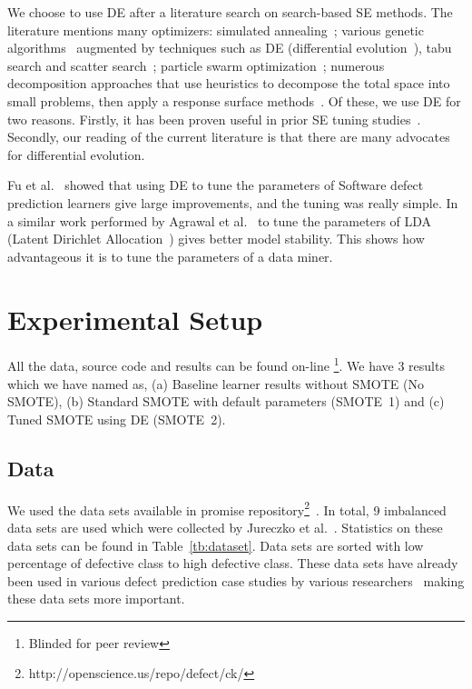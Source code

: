\documentclass[sigconf,review, anonymous]{acmart}
\theoremstyle{break}
\theoremstyle{break}
\begin{document}
We choose to use DE after a literature search on search-based SE methods.
The literature mentions many optimizers: simulated
annealing~\cite{feather2002converging, menzies2007business}; various genetic
algorithms~\cite{goldberg1979complexity} augmented by techniques such as
DE (differential evolution~\cite{storn1997differential}), tabu search and scatter
search~\cite{glover1986general, beausoleil2006moss, molina2007sspmo,nebro2008abyss}; particle swarm optimization~\cite{pan2008particle}; numerous
decomposition approaches that use heuristics to decompose the total space into
small problems, then apply a response surface methods~\cite{krall2015gale, zuluaga2013active}.
Of these, we use DE for two reasons. Firstly, it has been proven useful in prior SE tuning
studies~\cite{fu2016tuning, agrawal2016wrong}. Secondly, our reading of the current literature is
that there are many advocates for differential evolution.

Fu et al.~\cite{fu2016tuning} showed that using DE to tune the parameters of Software defect prediction learners give large improvements, and the tuning was really simple. In a similar work performed by Agrawal et al.~\cite{agrawal2016wrong} to tune the parameters of LDA (Latent Dirichlet Allocation~\cite{blei2003latent}) gives better model stability. This shows how advantageous it is to tune the parameters of a data miner.

\section{Experimental Setup}
\label{sect:experiment}

All the data, source code and results can be found on-line
\footnote{Blinded for peer review}.
We have 3 results which we have named as, (a) Baseline learner results without SMOTE (No SMOTE), (b) Standard SMOTE with default parameters (SMOTE~1) and (c) Tuned SMOTE using DE (SMOTE~2).

\subsection{\textbf{Data}}
 We used the data sets available in promise repository\footnote{http://openscience.us/repo/defect/ck/}~\cite{promiserepo}. In total, 9 imbalanced data sets are used which were collected by Jureczko et al.~\cite{jureczko2010towards}. Statistics on these data sets can be found in Table~\ref{tb:dataset}. Data sets are sorted with low percentage of defective class to high defective class. These data sets have already been used in various defect prediction case studies by various researchers~\cite{he2012investigation,peters2013better,peters2013balancing,turhan2013empirical} making these data sets more important.
 
\end{document}
